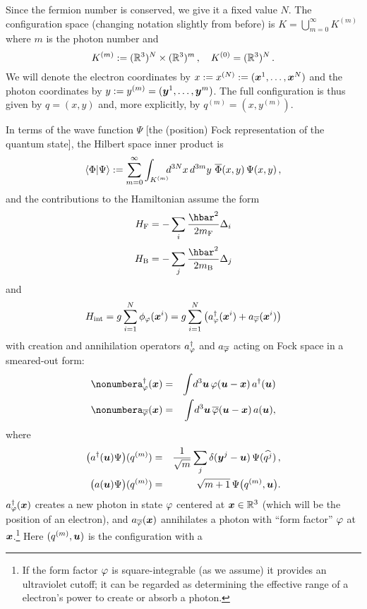 \documentclass[12pt]{article}
\begin{document}
Since the fermion number is conserved, we give it a fixed value
$N$. The configuration space (changing notation slightly from before) is $K =
\bigcup_{m=0}^\infty K^{(m)}$ where $m$ is the photon number and
$$%
  K^{(m)} := (\RRR^{3})^N \times (\RRR^{3})^m\,, \quad
  K^{(0)} = (\RRR^3)^N\,.
$$
We will denote the electron coordinates by
$x:=x^{(N)}:=(\boldsymbol{x}^1,\ldots,\boldsymbol{x}^N)$  and the photon coordinates by
$y:=y^{(m)}=(\boldsymbol y^1,\ldots,\boldsymbol y^m)$. The full configuration is thus given by
$q=(x,y)$ and, more explicitly, by $q^{(m)}=(x,y^{(m)})$. 

In terms of the wave function $\Psi$ [the (position) Fock representation of 
the quantum state], the Hilbert space inner product is
$$%
  \langle \Phi|\Psi\rangle := \sum_{m=0}^\infty \int_{K^{(m)}}\!\!\!
  \D^{3N}x\, \D^{3m}y\,\, \overline{\Phi}(x,y)\,
  \Psi(x,y)\,,
$$
and the contributions to the Hamiltonian assume the form $$H_\el = -\sum_i
\frac{\hbar^2}{2m_\el} \Laplace_i$$ $$H_\bo = -\sum_j
\frac{\hbar^2}{2m_\bo} \Laplace_j$$  and
\begin{equation}\label{HamiltonianInter}
  H_{\mathrm{int}} = g \sum_{i=1}^N \phi_\varphi(\boldsymbol{x}^i)=
  g \sum_{i=1}^N\left( a^{\dag}_\varphi(\boldsymbol{x}^i) +
  a_{\overline{\varphi}}(\boldsymbol{x}^i)\right) 
\end{equation}
with creation and annihilation operators $a^\dag_\varphi$ and
$a_{\overline{\varphi}}$ acting on Fock space in a smeared-out form:
\begin{eqnarray}\nonumber%
  a^{\dag}_\profile(\vx)
  &=&
  \int\!\D^3\vu \,\profile(\vu-\vx)\, a^{\dag}(\vu)
  \\\nonumber%
  a_{\overline\profile}(\vx)
  &=&
  \int\!\D^3\vu \,{\overline\profile}(\vu-\vx)\, a(\vu),
\end{eqnarray}
where
\begin{eqnarray}\label{cr}
  \big(a^\dag (\vu)\Psi\big)(q^{(m)}) 
  &=&
  \frac{1}{\sqrt{m}} \sum_j\delta(\vy^j-\vu) \,
  \Psi(\widehat{q^j}) \,,
  \\\label{an}
  \big(a(\vu) \Psi\big)(q^{(m)}) 
  &=&
  \sqrt{m+1} \, \Psi\big(q^{(m)},\vu\big).
\end{eqnarray}
$a^\dag_\varphi(\boldsymbol{x})$ creates a new photon in state $\varphi$ centered at
$\boldsymbol{x}\in \mathbb{R}^3$ (which will be the position of an electron), and
$a_{\overline{\varphi}}(\boldsymbol{x})$ annihilates a photon with ``form factor''
$\varphi$ at $\boldsymbol{x}$.\footnote{If the form factor $\varphi$ is
square-integrable (as we assume) it provides an ultraviolet cutoff; it can
be regarded as determining the effective range of a electron's power to
create or absorb a photon.} Here $(q^{(m)},\boldsymbol u)$ is the configuration with a
\end{document}
